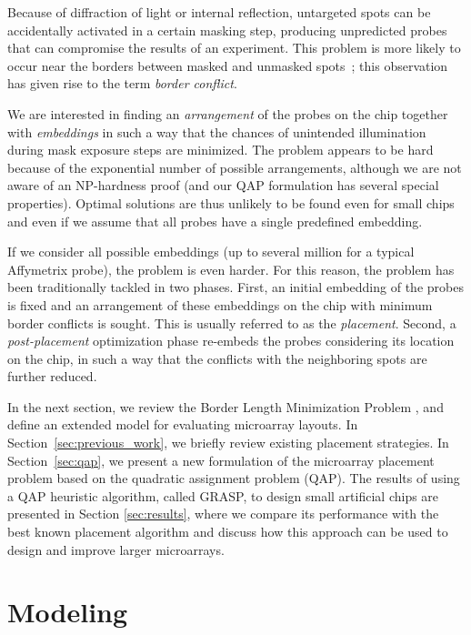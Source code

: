 \documentclass[english]{lni}
\begin{document}
Because of diffraction of light or internal reflection, untargeted spots can
be accidentally activated in a certain masking step, producing
unpredicted probes that can compromise the results of an experiment. This
problem is more likely to occur near the borders between masked and unmasked
spots~\cite{FODOR91}; this observation has given rise to the term
\emph{border conflict}.

We are interested in finding an \emph{arrangement} of the probes on the chip
together with \emph{embeddings} in such a way that the chances of unintended
illumination during mask exposure steps are minimized. The problem appears to
be hard because of the exponential number of possible arrangements, although
we are not aware of an NP-hardness proof (and our QAP formulation has several
special properties). Optimal solutions are thus unlikely to be found even
for small chips and even if we assume that all probes have a single predefined
embedding.

If we consider all possible embeddings (up to several million for a
typical Affymetrix probe), the problem is even harder.
For this reason, the problem has been traditionally tackled in two phases.
First, an initial embedding of the probes is fixed and an arrangement of these
embeddings on the chip with minimum border conflicts is sought. This is
usually referred to as the \emph{placement}. Second, a \emph{post-placement}
optimization phase re-embeds the probes considering its location on the chip,
in such a way that the conflicts with the neighboring spots are further
reduced.

In the next section, we review the Border Length Minimization Problem
\cite{HANNENHALLI02}, and define an extended model for evaluating microarray
layouts. In Section~\ref{sec:previous_work}, we briefly review existing
placement strategies. In Section~\ref{sec:qap}, we present a new formulation
of the microarray placement problem based on the quadratic assignment problem (QAP). The
results of using a QAP heuristic algorithm, called GRASP, to design small
artificial chips are presented in Section \ref{sec:results}, where we
compare its performance with the best known placement algorithm and
discuss how this approach can be used to design and improve larger microarrays.

\section{Modeling}
\label{sec:model}
\end{document}
